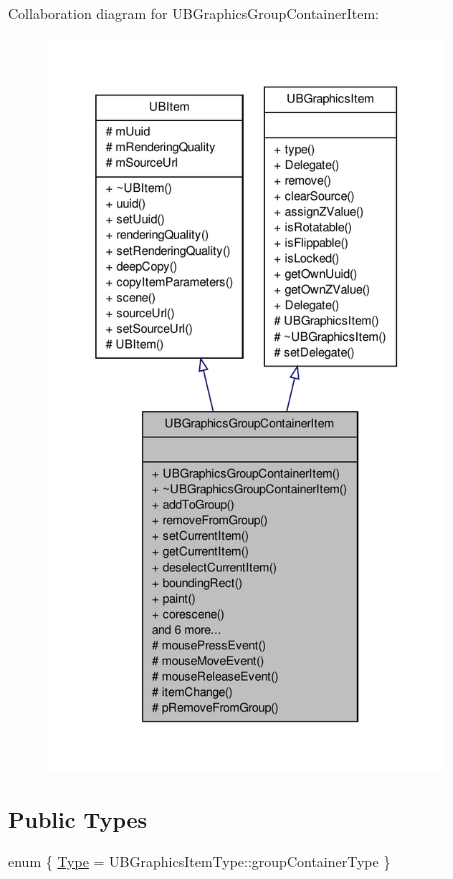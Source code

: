 Collaboration diagram for U\-B\-Graphics\-Group\-Container\-Item\-:
\nopagebreak
\begin{figure}[H]
\begin{center}
\leavevmode
\includegraphics[height=550pt]{d1/dfc/class_u_b_graphics_group_container_item__coll__graph}
\end{center}
\end{figure}
\subsection*{Public Types}
\begin{DoxyCompactItemize}
\item 
enum \{ \hyperlink{class_u_b_graphics_group_container_item_ad39fe3ee7e219e1d6aa20a87872a95ceaa41722c9d25c5573b0031a811262f974}{Type} =  U\-B\-Graphics\-Item\-Type\-:\-:group\-Container\-Type
 \}
\end{DoxyCompactItemize}
